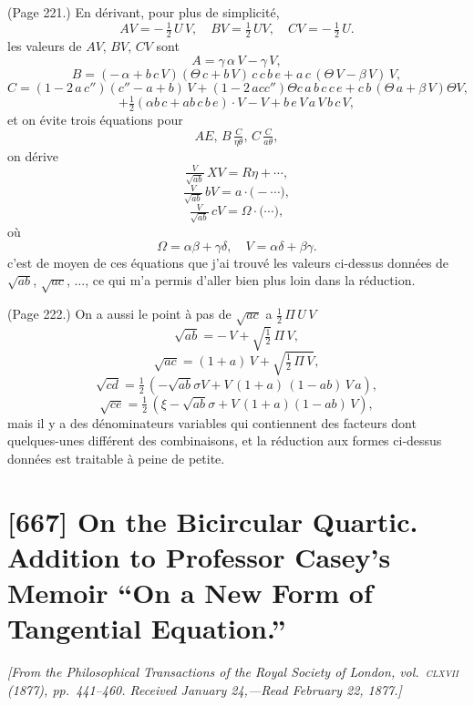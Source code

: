 \documentclass[11pt,a4paper]{book}
\begin{document}
\medskip

\noindent (Page 221.) En d\'erivant, pour plus de simplicit\'e,
\[
A V = -\,\tfrac{1}{2}\,U\,V,\quad B V = \tfrac{1}{2}\,U V,\quad C V = - \,\tfrac{1}{2}\,U.
\]
les valeurs de $A V$, $B V$, $C V$ sont
\[
A = \gamma\,\alpha\,V - \gamma\,V,
\]
\[
B = (-\,\alpha + b\,c\,V) (\Theta\,c + b\,V)\,c\,c\,b\,e + a\,c\,(\Theta\,V - \beta\,V)\,V,
\]
\[
C = (1 - 2\,a\,c'')(c'' - a + b)\,V + (1 - 2\,a c c'')\Theta c\,a\,b\,c\,c\,e + c\,b\,(\Theta\,a + \beta\,V)\Theta V,
\]
\[
+ \tfrac{1}{2}(\alpha b\,c + a b\,c\,b\,e) \cdot V - V + b\,e\,V\,a\,V\,b\,c\,V,
\]
et on \'evite trois \'equations pour
\[
A E,\,B\,\tfrac{C}{\eta\theta},\,C\,\tfrac{C}{a\theta},
\]
on d\'erive
\[
\tfrac{V}{\sqrt{a b}}\,X V = R\eta + \cdots,
\]
\[
\tfrac{V}{\sqrt{a b}}\,b V = a \cdot \big(- \cdots\big),
\]
\[
\tfrac{V}{\sqrt{a b}}\,c V = \Omega \cdot \big( \cdots \big),
\]
o\`u
\[
\Omega = \alpha\beta + \gamma\delta,\quad V = \alpha\delta + \beta\gamma.
\]
c'est de moyen de ces \'equations que j'ai trouv\'e les valeurs ci-dessus donn\'ees de $\sqrt{a b}$, $\sqrt{a c}$, $\ldots$, ce qui m'a permis d'aller bien plus loin dans la r\'eduction.

\medskip

\noindent (Page 222.) On a aussi le point \`a pas de $\sqrt{a c}$ a $\tfrac{1}{2}\,\Pi\,U\,V$
\[
\sqrt{a b} = -\,V + \sqrt{\tfrac{1}{2}}\,\Pi\,V,
\]
\[
\sqrt{a c} = (1 + a)\,V + \sqrt{\tfrac{1}{2}\,\Pi\,V},
\]
\[
\sqrt{c d} = \tfrac{1}{2}\,(- \sqrt{a b}\sigma V + V\,(1 + a)\,(1 - a b)\,V\,a),
\]
\[
\sqrt{c e} = \tfrac{1}{2}\,(\xi - \sqrt{a b}\sigma + V\,(1 + a) (1 - ab)\,V),
\]
mais il y a des d\'enominateurs variables qui contiennent des facteurs dont quelques-unes diff\'erent des combinaisons, et la r\'eduction aux formes ci-dessus donn\'ees est traitable \`a peine de petite.

\bigskip

\section{[667] On the Bicircular Quartic. Addition to Professor Casey's Memoir ``On a New Form of Tangential Equation.''}
\label{sec:667}

\noindent\textit{[From the \emph{Philosophical Transactions of the Royal Society of London}, vol.~\textsc{clxvii} (1877), pp.~441--460. Received January 24,---Read February 22, 1877.]}
\end{document}
